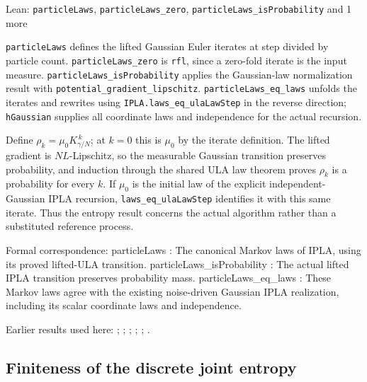 \documentclass[11pt,a4paper]{report}
\newcommand{\leanlabel}[1]{\par\smallskip\noindent{\small\bfseries #1}\par}
\begin{document}
\begin{leanbox}{Lean: \texttt{particleLaws}, \texttt{particleLaws\_\allowbreak{}zero}, \texttt{particleLaws\_\allowbreak{}isProbability} and 1 more}
\leanlabel{How the Lean proof follows the argument}
\texttt{particle\allowbreak{}Laws} defines the lifted Gaussian Euler iterates at step divided by particle count. \texttt{particle\allowbreak{}Laws\_\allowbreak{}zero} is \texttt{rfl}, since a zero-fold iterate is the input measure. \texttt{particle\allowbreak{}Laws\_\allowbreak{}is\allowbreak{}Probability} applies the Gaussian-law normalization result with \texttt{potential\_\allowbreak{}gradient\_\allowbreak{}lipschitz}. \texttt{particle\allowbreak{}Laws\_\allowbreak{}eq\_\allowbreak{}laws} unfolds the iterates and rewrites using \texttt{IPLA.\allowbreak{}laws\_\allowbreak{}eq\_\allowbreak{}ula\allowbreak{}Law\allowbreak{}Step} in the reverse direction; \texttt{h\allowbreak{}Gaussian} supplies all coordinate laws and independence for the actual recursion.



Define \(\rho_k=\mu_0K_{\gamma/N}^{\,k}\); at \(k=0\) this is \(\mu_0\) by the iterate definition. The lifted gradient is \(NL\)-Lipschitz, so the measurable Gaussian transition preserves probability, and induction through the shared ULA law theorem proves \(\rho_k\) is a probability for every \(k\). If \(\mu_0\) is the initial law of the explicit independent-Gaussian IPLA recursion, \texttt{laws\_\allowbreak{}eq\_\allowbreak{}ula\allowbreak{}Law\allowbreak{}Step} identifies it with this same iterate. Thus the entropy result concerns the actual algorithm rather than a substituted reference process.



Formal correspondence: particleLaws : The canonical Markov laws of IPLA, using its proved lifted-ULA transition. particleLaws\_isProbability : The actual lifted IPLA transition preserves probability mass. particleLaws\_eq\_laws : These Markov laws agree with the existing noise-driven Gaussian IPLA realization, including its scalar coordinate laws and independence.
\end{leanbox}


Earlier results used here: \cite[Section~3.8.2]{LangevinLean2026ULALSI}; \cite[Section~3.8.8]{LangevinLean2026ULALSI}; \cite[Section~3.1.1]{LangevinLean2026IPLA}; \cite[Section~3.1.4]{LangevinLean2026IPLA}; \cite[Section~3.16.3]{LangevinLean2026IPLA}; \cite[Section~3.3.2]{LangevinLean2026IPLA}.
\subsection{\texorpdfstring{Finiteness of the discrete joint entropy}{Finiteness of the discrete joint entropy}}
\label{report-step-IPLA-LSI-Theorem-lean-2}
\end{document}

